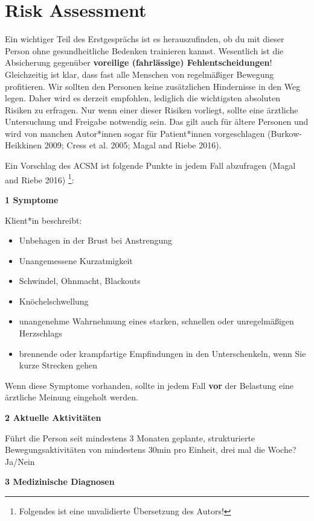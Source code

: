 \documentclass[
  letterpaper,
  DIV=11,
  numbers=noendperiod]{scrreprt}
\providecommand{\tightlist}{%
  \setlength{\itemsep}{0pt}\setlength{\parskip}{0pt}}
\begin{document}
\section{Risk Assessment}\label{sec-risk-assessment}

Ein wichtiger Teil des Erstgesprächs ist es herauszufinden, ob du mit
dieser Person ohne gesundheitliche Bedenken trainieren kannst.
Wesentlich ist die Absicherung gegenüber \textbf{voreilige (fahrlässige)
Fehlentscheidungen}! Gleichzeitig ist klar, dass fast alle Menschen von
regelmäßiger Bewegung profitieren. Wir sollten den Personen keine
zusätzlichen Hindernisse in den Weg legen. Daher wird es derzeit
empfohlen, lediglich die wichtigsten absoluten Risiken zu erfragen. Nur
wenn einer dieser Risiken vorliegt, sollte eine ärztliche Untersuchung
und Freigabe notwendig sein. Das gilt auch für ältere Personen und wird
von manchen Autor*innen sogar für Patient*innen vorgeschlagen
(Burkow-Heikkinen 2009; Cress et al. 2005; Magal and Riebe 2016).

Ein Vorschlag des ACSM ist folgende Punkte in jedem Fall abzufragen
(Magal and Riebe 2016) \footnote{Folgendes ist eine unvalidierte
  Übersetzung des Autors!}:

\textbf{1 Symptome}

Klient*in beschreibt:

\begin{itemize}
\tightlist
\item
  Unbehagen in der Brust bei Anstrengung
\item
  Unangemessene Kurzatmigkeit
\item
  Schwindel, Ohnmacht, Blackouts
\item
  Knöchelschwellung
\item
  unangenehme Wahrnehmung eines starken, schnellen oder unregelmäßigen
  Herzschlags
\item
  brennende oder krampfartige Empfindungen in den Unterschenkeln, wenn
  Sie kurze Strecken gehen
\end{itemize}

Wenn diese Symptome vorhanden, sollte in jedem Fall \textbf{vor} der
Belastung eine ärztliche Meinung eingeholt werden.

\textbf{2 Aktuelle Aktivitäten}

Führt die Person seit mindestens 3 Monaten geplante, strukturierte
Bewegungsaktivitäten von mindestens 30min pro Einheit, drei mal die
Woche? Ja/Nein

\textbf{3 Medizinische Diagnosen}
\end{document}
